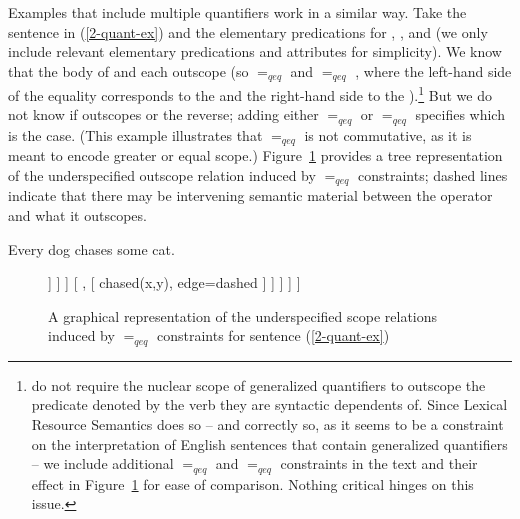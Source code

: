 \documentclass[output=paper
	        ,collection
	        ,collectionchapter
 	        ,biblatex
                ,babelshorthands
                ,newtxmath
                ,draftmode
                ,colorlinks, citecolor=brown
]{langscibook}
\begin{document}
Examples that include multiple quantifiers work in a similar way. Take the sentence in (\ref{2-quant-ex}) and the elementary predications for , , and  (we only include relevant elementary predications and attributes for simplicity). We know that the body of  and  each outscope  (so  $=_{qeq}$  and  $=_{qeq}$ , where the left-hand side of the equality corresponds to the  and the right-hand side to the ).\footnote{\citet{Copestakeetal2005} do not require the nuclear scope of generalized quantifiers to outscope the predicate denoted by the verb they are syntactic dependents of. Since Lexical Resource Semantics does so -- and correctly so, as it seems to be a constraint on the interpretation of English sentences that contain generalized quantifiers -- we include additional  $=_{qeq}$  and  $=_{qeq}$  constraints in the text and their effect in Figure~\ref{fig:MRS-tree} for ease of comparison. Nothing critical hinges on this issue.} But we do not know if  outscopes  or the reverse; adding either   $=_{qeq}$  or  $=_{qeq}$  specifies which is the case. (This example illustrates that $=_{qeq}$ is not commutative, as it is meant to encode greater or equal scope.) Figure~\ref{fig:MRS-tree} provides a tree representation of the underspecified outscope relation induced by $=_{qeq}$ constraints; dashed lines indicate that there may be intervening semantic material between the operator and what it outscopes.

\begin{exe}
\ex\label{2-quant-ex}Every dog chases some cat.
\ex\label{2-quant-sem}
\end{exe}

\begin{figure}
\begin{forest}
[ top
[ {chased(x,y)}, edge=dashed
	[ every, no edge
		[ dog(x), edge=dashed ]
		[ {}, no edge 
				[ some(y), no edge 
					[ cat (y), edge=dashed ] 
					[ {}, [ {chased(x,y)}, edge=dashed	 ] ] ] ] 
		[ {}, [ {chased(x,y)}, edge=dashed ] ]			
					] 
	]
	]
\end{forest}
\caption{\label{fig:MRS-tree}A graphical representation of the underspecified scope relations induced by $=_{qeq}$ constraints for sentence (\ref{2-quant-ex})}
\end{figure}
\end{document}
